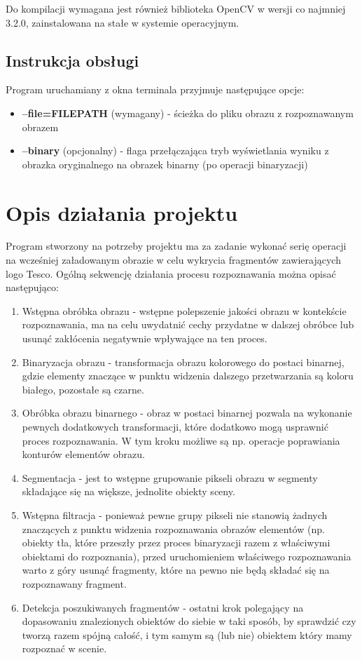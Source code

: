 \documentclass[11pt,a4paper]{article} %
\numberwithin{equation}{section} %
\numberwithin{figure}{section} %
\numberwithin{table}{section} %
\begin{document}
Do kompilacji wymagana jest również biblioteka OpenCV w wersji co najmniej 3.2.0, zainstalowana na stałe w systemie operacyjnym.

\subsection{Instrukcja obsługi}

Program uruchamiany z okna terminala przyjmuje następujące opcje:
\begin{itemize}
	\item \textbf{--file=FILEPATH} (wymagany) - ścieżka do pliku obrazu z rozpoznawanym obrazem
	\item \textbf{--binary} (opcjonalny) - flaga przełączająca tryb wyświetlania wyniku z obrazka oryginalnego na obrazek binarny (po operacji binaryzacji)
\end{itemize}

\section{Opis działania projektu}

Program stworzony na potrzeby projektu ma za zadanie wykonać serię operacji na wcześniej załadowanym obrazie w celu wykrycia fragmentów zawierających logo Tesco. Ogólną sekwencję działania procesu rozpoznawania można opisać następująco:
\begin{enumerate}
	\item Wstępna obróbka obrazu - wstępne polepszenie jakości obrazu w kontekście rozpoznawania, ma na celu uwydatnić cechy przydatne w dalszej obróbce lub usunąć zakłócenia negatywnie wpływające na ten proces.
	\item Binaryzacja obrazu - transformacja obrazu kolorowego do postaci binarnej, gdzie elementy znaczące w punktu widzenia dalszego przetwarzania są koloru białego, pozostałe są czarne.
	\item Obróbka obrazu binarnego - obraz w postaci binarnej pozwala na wykonanie pewnych dodatkowych transformacji, które dodatkowo mogą usprawnić proces rozpoznawania. W tym kroku możliwe są np. operacje poprawiania konturów elementów obrazu.
	\item Segmentacja - jest to wstępne grupowanie pikseli obrazu w segmenty składające się na większe, jednolite obiekty sceny.
	\item Wstępna filtracja - ponieważ pewne grupy pikseli nie stanowią żadnych znaczących z punktu widzenia rozpoznawania obrazów elementów (np. obiekty tła, które przeszły przez proces binaryzacji razem z właściwymi obiektami do rozpoznania), przed uruchomieniem właściwego rozpoznawania warto z góry usunąć fragmenty, które na pewno nie będą składać się na rozpoznawany fragment.
	\item Detekcja poszukiwanych fragmentów - ostatni krok polegający na dopasowaniu znalezionych obiektów do siebie w taki sposób, by sprawdzić czy tworzą razem spójną całość, i tym samym są (lub nie) obiektem który mamy rozpoznać w scenie.
\end{enumerate}
\end{document}
